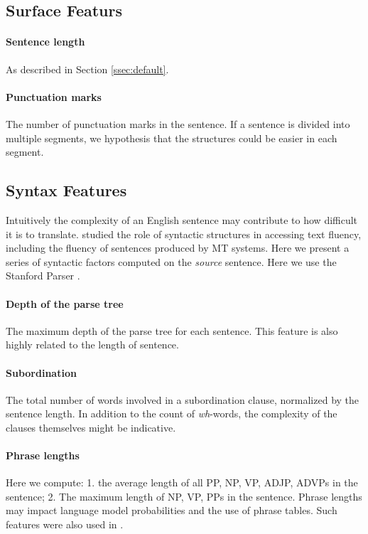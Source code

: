 \documentclass[11pt]{article}
\begin{document}
\subsection{Surface Featurs}
\paragraph{Sentence length} As described in Section \ref{ssec:default}.
\paragraph{Punctuation marks} The number of punctuation marks in the sentence. If a sentence is divided into multiple segments, we hypothesis that the structures could be easier in each segment.

\subsection{Syntax Features}
Intuitively the complexity of an English sentence may contribute to how difficult it is to translate.  studied the role of syntactic structures in accessing text fluency, including the fluency of sentences produced by MT systems. Here we present a series of syntactic factors computed on the {\em source} sentence. Here we use the Stanford Parser \cite{Klein03fastexact}. 

\paragraph{Depth of the parse tree} The maximum depth of the parse tree for each sentence. This feature is also highly related to the length of sentence.
\paragraph{Subordination} The total number of words involved in a subordination clause, normalized by the sentence length. In addition to the count of {\em wh}-words, the complexity of the clauses themselves might be indicative.
\paragraph{Phrase lengths} Here we compute: 1. the average length of all PP, NP, VP, ADJP, ADVPs in the sentence; 2. The maximum length of NP, VP, PPs in the sentence. Phrase lengths may impact language model probabilities and the use of phrase tables. Such features were also used in \cite{Chae:2009:PFT:1609067.1609082}.
\end{document}
